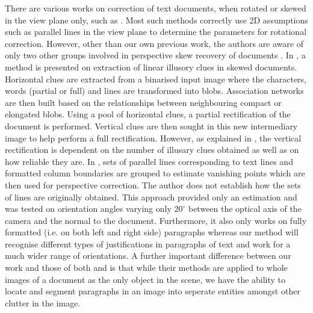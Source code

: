 \documentclass{elsart}   %
\begin{document}
There are various works on correction of text documents, when rotated or skewed
in the view plane only, such as \cite{Yu96,Amin96,docsthrucams,messelod1}. 
Most such methods correctly use 2D assumptions such as parallel lines in the
view plane to determine the parameters for rotational correction. 
However, other than our own previous work, the authors are aware of only two
other groups involved in perspective skew recovery of documents
\cite{pilucvpr1,dance02}. In \cite{pilucvpr1}, a method is presented on extraction of linear illusory clues in
skewed documents. Horizontal clues  are extracted from
a binarised input image where the characters, words (partial or full) and lines
are transformed into blobs. Association networks are then built based on the
relationships between neighbouring compact or elongated blobs. Using a pool of
horizontal clues, a partial rectification of the document is performed.
Vertical clues are then sought in this new intermediary image to help perform a
full rectification. However, as explained in \cite{pilucvpr1},  the vertical
rectification is dependent on the number of illusary clues obtained as well as
on how reliable they are. In \cite{dance02}, sets of parallel lines
corresponding to text lines and formatted column boundaries are grouped to 
estimate vanishing points which are then used for perspective correction.
The author does not establish how the sets of lines are originally obtained.
This approach provided only an estimation and was  tested on orientation
angles varying only $20^\circ$ between the optical axis of the camera and the
normal to the document. Furthermore, it also only works on fully formatted
(i.e. on both left and right 
side) paragraphs whereas our method will  recognise different types of
justifications in paragraphs of text and work for a much
wider range of orientations. A further important difference between our work and 
those of both \cite{pilucvpr1} and \cite{dance02} is that while their methods
are applied to whole images of a document as the only object in the scene, we have the ability to locate and segment
paragraphs in an image into seperate entities amongst other clutter in the image.
\end{document}
